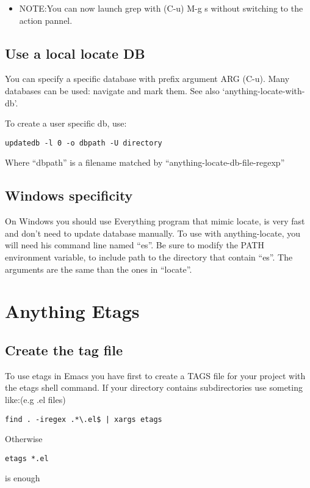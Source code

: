 \documentclass[a4paper,11pt]{article}
\begin{document}
\begin{itemize}
\item NOTE:You can now launch grep with (C-u) M-g s without switching to the action pannel.
\end{itemize}

\subsection{Use a local locate DB}
\label{sec:use-local-locate}

You can specify a specific database with prefix argument ARG (C-u).
Many databases can be used: navigate and mark them.
See also `anything-locate-with-db'.

To create a user specific db, use:
\begin{verbatim}
updatedb -l 0 -o dbpath -U directory
\end{verbatim}

Where ``dbpath'' is a filename matched by
``anything-locate-db-file-regexp''

\subsection{Windows specificity}
\label{sec:windows-specificity}

On Windows you should use Everything program that mimic locate, is very fast and don't need to
update database manually.
To use with anything-locate, you will need his command line named ``es''.
Be sure to modify the PATH environment variable, to include path to the directory that contain ``es''.
The arguments are the same than the ones in ``locate''.

\section{Anything Etags}
\label{sec:anything-etags}

\subsection{Create the tag file}
\label{sec:create-tag-file}


To use etags in Emacs you have first to create a TAGS file for your project with the etags shell command.
If your directory contains subdirectories use someting like:(e.g .el files)
\begin{verbatim}
find . -iregex .*\.el$ | xargs etags
\end{verbatim}
Otherwise
\begin{verbatim}
etags *.el
\end{verbatim}
is enough
\end{document}

